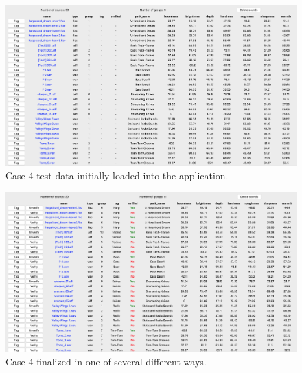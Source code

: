 \begin{figure}[ht]
    \includegraphics[width=\textwidth]{figures/case_4/initial}
    \caption{Case 4 test data initially loaded into the application.}\label{fig:case_4/initial}
\end{figure}

\begin{figure}[ht]
    \includegraphics[width=\textwidth]{figures/case_4/finalized}
    \caption{Case 4 finalized in one of several different ways.}\label{fig:case_4/finalized}
\end{figure}

\egroup{}